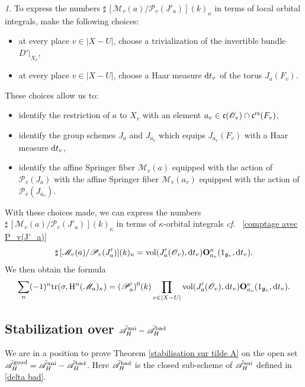 \documentclass[12pt,english]{smfart}
\numberwithin{equation}{subsection}
\theoremstyle{remark}
\newtheorem{numero}[equation]{}
\newcommand\calA{{\mathscr A}}
\newcommand\calP{{\mathscr P}}
\newcommand\calM{{\mathscr M}}
\newcommand\calO{{\mathscr O}}
\newcommand\frakg{{\mathfrak g}}
\newcommand\frakc{{\mathfrak c}}
\newcommand\rmH{{\rm H}}
\newcommand\tr{{\rm tr}}
\newcommand\cf{{\it cf.\ }}
\newcommand\rs{{\rm rs}}
\newcommand\ani{{\rm ani}}
\begin{document}
\begin{numero}\label{trivialisation de D'}
To express the numbers $\sharp\,[\calM_v(a)/ \calP_v(J'_a)](k)_\kappa$
in terms of local orbital integrals, make the following choices:
\begin{itemize}
  \item at every place $v\in |X-U|$, choose a trivialization of the
      invertible bundle $D'|_{X_v}$,
  \item at every place $v\in |X-U|$, choose a Haar measure
      ${\rm d}t_v$ of the torus $J_a(F_v)$.
\end{itemize}
These choices allow us to:
\begin{itemize}
  \item identify the restriction of $a$ to $X_v$ with an element
      $a_v\in\frakc(\calO_v)\cap \frakc^\rs(F_v)$,
  \item identify the group schemes $J_a$ and $J_{a_v}$ which
      equips $J_{a_v}(F_v)$ with a Haar measure ${\rm d}t_v$,
  \item identify the affine Springer fiber $\calM_v(a)$ equipped with
      the action of $\calP_v(J_a)$ with the affine Springer fiber
      $\calM_v(a_v)$ equipped with the action of $\calP_v(J_{a_v})$.
\end{itemize}
\end{numero}
With these choices made, we can express the numbers $\sharp\,[\calM_v(a)/
\calP_v(J'_a)](k)_\kappa$ in terms of $\kappa$-orbital integrals \cf
\ref{comptage avec P_v(J'_a)}
$$\sharp\,[\calM_v(a)/ \calP_v(J'_a)](k)_\kappa=
{\rm vol}(J'_a(\calO_v),{\rm d}t_v){\bf O}^\kappa_{a_v}(1_{\frakg_v},{\rm
d}t_v).
$$
We then obtain the formula
$$\sum_n (-1)^n\tr(\sigma, \rmH^n(\calM_a)_\kappa)=
(\calP'_a)^0(k) \prod_{v\in |X-U|} {\rm vol} (J'_a(\calO_v),{\rm d}t_v){\bf
O}^\kappa_{a_v}(1_{\frakg_v},{\rm d}t_v).$$


\subsection{Stabilization over $\tilde\calA_H^{\rm ani} -\tilde\calA_H^{\rm bad}$}
\label{subsection : A good}

We are in a position to prove Theorem \ref{stabilisation sur tilde
A} on the open set $\tilde\calA_H^{\rm good}=\tilde\calA_H^{\rm ani}
-\tilde\calA_H^{\rm bad}$. Here $\tilde\calA_H^{\rm bad}$ is the closed sub-scheme of $\tilde\calA_H^\ani$ defined in \ref{delta bad}.
\end{document}
